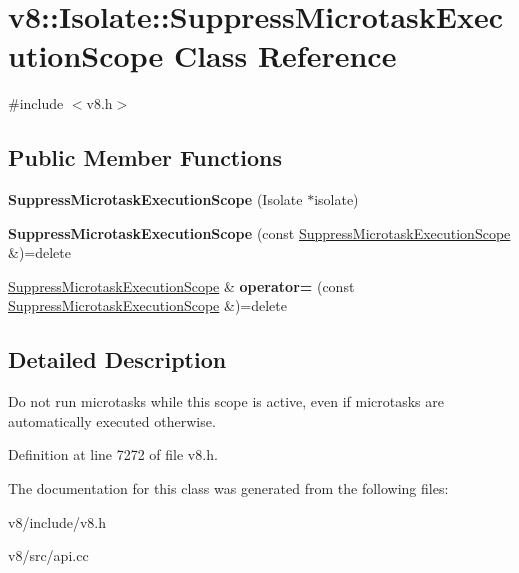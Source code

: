\hypertarget{classv8_1_1Isolate_1_1SuppressMicrotaskExecutionScope}{}\section{v8\+:\+:Isolate\+:\+:Suppress\+Microtask\+Execution\+Scope Class Reference}
\label{classv8_1_1Isolate_1_1SuppressMicrotaskExecutionScope}


{\ttfamily \#include $<$v8.\+h$>$}

\subsection*{Public Member Functions}
\begin{DoxyCompactItemize}
\item 
\mbox{\label{classv8_1_1Isolate_1_1SuppressMicrotaskExecutionScope_a846d7dd39f4cfad4dfc4c8c785e4a65e}} 
{\bfseries Suppress\+Microtask\+Execution\+Scope} (Isolate $\ast$isolate)
\item 
\mbox{\label{classv8_1_1Isolate_1_1SuppressMicrotaskExecutionScope_ae4d7f51ceab47cabf1f78f65224ca95d}} 
{\bfseries Suppress\+Microtask\+Execution\+Scope} (const \mbox{\hyperlink{classv8_1_1Isolate_1_1SuppressMicrotaskExecutionScope}{Suppress\+Microtask\+Execution\+Scope}} \&)=delete
\item 
\mbox{\label{classv8_1_1Isolate_1_1SuppressMicrotaskExecutionScope_a48038b7c5037f6a329c27ccffef0e71c}} 
\mbox{\hyperlink{classv8_1_1Isolate_1_1SuppressMicrotaskExecutionScope}{Suppress\+Microtask\+Execution\+Scope}} \& {\bfseries operator=} (const \mbox{\hyperlink{classv8_1_1Isolate_1_1SuppressMicrotaskExecutionScope}{Suppress\+Microtask\+Execution\+Scope}} \&)=delete
\end{DoxyCompactItemize}


\subsection{Detailed Description}
Do not run microtasks while this scope is active, even if microtasks are automatically executed otherwise. 

Definition at line 7272 of file v8.\+h.



The documentation for this class was generated from the following files\+:\begin{DoxyCompactItemize}
\item 
v8/include/v8.\+h\item 
v8/src/api.\+cc\end{DoxyCompactItemize}
